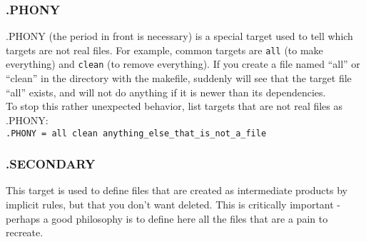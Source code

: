 \subsubsection{.PHONY}
.PHONY (the period in front is necessary) is a special target used to tell \maken{} which targets are not real files. For example, common targets are \texttt{all} (to make everything) and \texttt{clean} (to remove everything). If you create a file named ``all'' or ``clean'' in the directory with the makefile, suddenly \maken{} will see that the target file ``all'' exists, and will not do anything if it is newer than its dependencies.\\

To stop this rather unexpected behavior, list targets that are not real files as .PHONY:\\

\texttt{.PHONY = all clean anything_else_that_is_not_a_file}

\subsubsection{.SECONDARY}
This target is used to define files that are created as intermediate products by implicit rules, but that you don't want deleted. This is critically important - perhaps a good philosophy is to define here all the files that are a pain to recreate.\\

